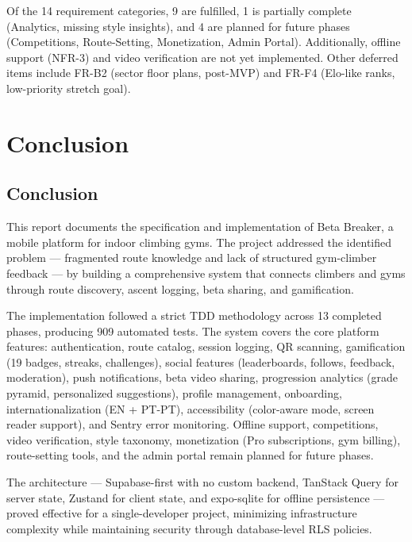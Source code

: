 \documentclass[12pt,a4paper]{report}
\renewcommand\_{\textunderscore\hspace{0pt}}
\begin{document}
Of the 14 requirement categories, 9 are fulfilled, 1 is partially complete (Analytics, missing style insights), and 4 are planned for future phases (Competitions, Route-Setting, Monetization, Admin Portal). Additionally, offline support (NFR-3) and video verification are not yet implemented. Other deferred items include FR-B2 (sector floor plans, post-MVP) and FR-F4 (Elo-like ranks, low-priority stretch goal).

\chapter{Conclusion}

\section{Conclusion}

This report documents the specification and implementation of Beta Breaker, a mobile platform for indoor climbing gyms. The project addressed the identified problem --- fragmented route knowledge and lack of structured gym-climber feedback --- by building a comprehensive system that connects climbers and gyms through route discovery, ascent logging, beta sharing, and gamification.

The implementation followed a strict TDD methodology across 13 completed phases, producing 909 automated tests. The system covers the core platform features: authentication, route catalog, session logging, QR scanning, gamification (19 badges, streaks, challenges), social features (leaderboards, follows, feedback, moderation), push notifications, beta video sharing, progression analytics (grade pyramid, personalized suggestions), profile management, onboarding, internationalization (EN + PT-PT), accessibility (color-aware mode, screen reader support), and Sentry error monitoring. Offline support, competitions, video verification, style taxonomy, monetization (Pro subscriptions, gym billing), route-setting tools, and the admin portal remain planned for future phases.

The architecture --- Supabase-first with no custom backend, TanStack Query for server state, Zustand for client state, and expo-sqlite for offline persistence --- proved effective for a single-developer project, minimizing infrastructure complexity while maintaining security through database-level RLS policies.
\end{document}
